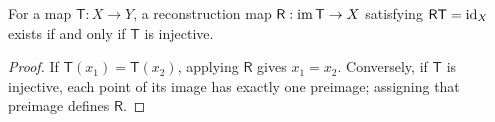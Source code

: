 \setcounter{theorem}{0}
\begin{proposition}
For a map $\mathsf T:X\to Y$, a reconstruction map $\mathsf R:\operatorname{im}\mathsf T\to X$ satisfying $\mathsf R\mathsf T=\mathrm{id}_X$ exists if and only if $\mathsf T$ is injective.
\end{proposition}
\begin{proof}
If $\mathsf T(x_1)=\mathsf T(x_2)$, applying $\mathsf R$ gives $x_1=x_2$. Conversely, if $\mathsf T$ is injective, each point of its image has exactly one preimage; assigning that preimage defines $\mathsf R$.
\end{proof}
